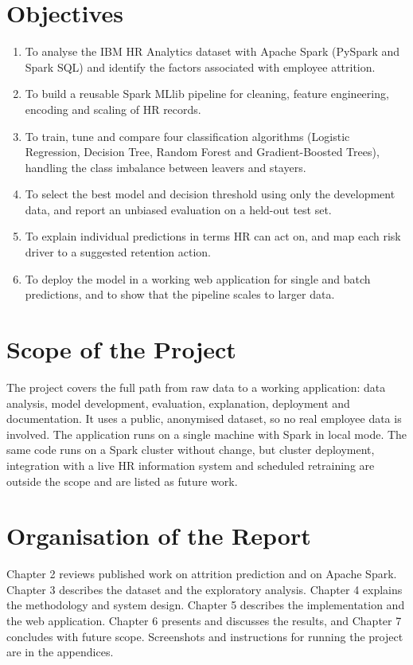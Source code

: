 \documentclass[12pt,a4paper]{report}
\begin{document}
\section{Objectives}

\begin{enumerate}
\item To analyse the IBM HR Analytics dataset with Apache Spark (PySpark and Spark SQL) and identify the factors associated with employee attrition.
\item To build a reusable Spark MLlib pipeline for cleaning, feature engineering, encoding and scaling of HR records.
\item To train, tune and compare four classification algorithms (Logistic Regression, Decision Tree, Random Forest and Gradient-Boosted Trees), handling the class imbalance between leavers and stayers.
\item To select the best model and decision threshold using only the development data, and report an unbiased evaluation on a held-out test set.
\item To explain individual predictions in terms HR can act on, and map each risk driver to a suggested retention action.
\item To deploy the model in a working web application for single and batch predictions, and to show that the pipeline scales to larger data.
\end{enumerate}

\section{Scope of the Project}

The project covers the full path from raw data to a working application: data analysis, model development, evaluation, explanation, deployment and documentation. It uses a public, anonymised dataset, so no real employee data is involved. The application runs on a single machine with Spark in local mode. The same code runs on a Spark cluster without change, but cluster deployment, integration with a live HR information system and scheduled retraining are outside the scope and are listed as future work.

\section{Organisation of the Report}

Chapter 2 reviews published work on attrition prediction and on Apache Spark. Chapter 3 describes the dataset and the exploratory analysis. Chapter 4 explains the methodology and system design. Chapter 5 describes the implementation and the web application. Chapter 6 presents and discusses the results, and Chapter 7 concludes with future scope. Screenshots and instructions for running the project are in the appendices.
\end{document}
